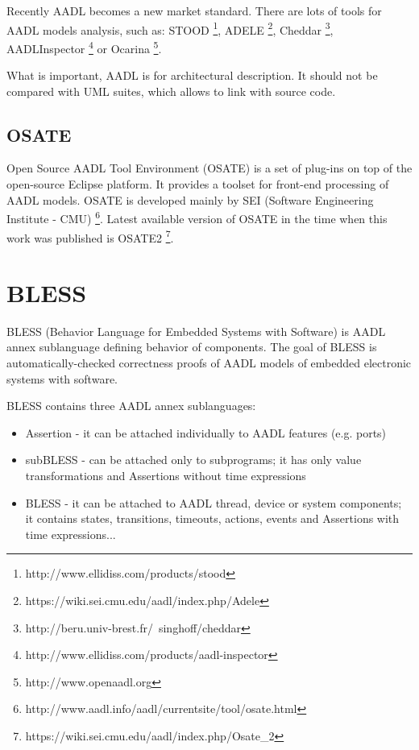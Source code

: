 Recently AADL becomes a new market standard. There are lots of tools for AADL models analysis, such as: STOOD \footnote{http://www.ellidiss.com/products/stood}, ADELE \footnote{https://wiki.sei.cmu.edu/aadl/index.php/Adele}, Cheddar \footnote{http://beru.univ-brest.fr/~singhoff/cheddar}, AADLInspector \footnote{http://www.ellidiss.com/products/aadl-inspector} or Ocarina \footnote{http://www.openaadl.org}.

What is important, AADL is for architectural description. It should not be compared with UML suites, which allows to link with source code.


\subsection{OSATE}
\label{background:aadl:osate}
Open Source AADL Tool Environment (OSATE) is a set of plug-ins on top of the open-source Eclipse platform. It provides a toolset for front-end processing of AADL models. OSATE is developed mainly by SEI (Software Engineering Institute - CMU) \footnote{http://www.aadl.info/aadl/currentsite/tool/osate.html}. Latest available version of OSATE in the time when this work was published is OSATE2 \footnote{https://wiki.sei.cmu.edu/aadl/index.php/Osate\_2}.



\section{BLESS}
\label{background:bless}
BLESS (Behavior Language for Embedded Systems with Software) is AADL annex sublanguage defining behavior of components. The goal of BLESS is automatically-checked correctness proofs of AADL models of embedded electronic systems with software.

BLESS contains three AADL annex sublanguages:
\begin{itemize} \itemsep1pt \parskip0pt 
	\item Assertion - it can be attached individually to AADL features (e.g. ports)
	\item subBLESS - can be attached only to subprograms; it has only value transformations and Assertions without time expressions
	\item BLESS - it can be attached to AADL thread, device or system components; it contains states, transitions, timeouts, actions, events and Assertions with time expressions...
\end{itemize}

